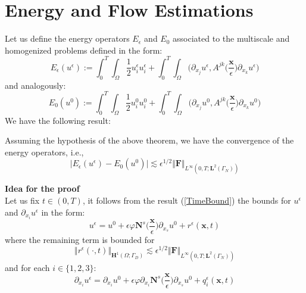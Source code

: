 \section{Energy and Flow Estimations}
Let us define the energy operators $E_{\epsilon}$ and $E_{0}$ associated to the multiscale and homogenized problems defined in the form:
\begin{equation*}
    E_{\epsilon}(u^{\epsilon}) := \int_0^T \int_{\Omega} \frac{1}{2}u_i^{\epsilon}u_i^{\epsilon} + \int_0^T \int_{\Omega} \big( \partial_{x_j} u^{\epsilon}, A^{jk} \big( \frac{\mathbf{x}}{\epsilon}\big) \partial_{x_k} u^{\epsilon} \big)
\end{equation*}
and analogously:
\begin{equation*}
    E_0(u^0) := \int_0^T \int_{\Omega} \frac{1}{2}u_i^{0}u_i^{0} + \int_0^T \int_{\Omega} \big( \partial_{x_j} u^0, A^{jk} \big( \frac{\mathbf{x}}{\epsilon}\big) \partial_{x_k} u^0 \big)
\end{equation*}
We have the following result:
\begin{lem}
Assuming the hypothesis of the above theorem, we have the convergence of the energy operators, i.e., 
\begin{equation*}
    \vert E_{\epsilon} (u^{\epsilon}) - E_0 (u^0) \vert \lesssim \epsilon^{1/2} \Vert \mathbf{F} \Vert_{L^{\infty}(0,T; \mathbf{L}^{2}(\Gamma_N))} 
\end{equation*}
\end{lem}
\textbf{Idea for the proof} \\
Let us fix $t \in (0,T)$, it follows from the result (\ref{TimeBound}) the bounds for $u^{\epsilon}$ and $\partial_{x_i} u^{\epsilon}$ in the form:
\begin{equation*}
    u^{\epsilon} = u^0 + \epsilon \varphi \mathbf{N}^s\big( \frac{\mathbf{x}}{\epsilon} \big) \partial_{x_s} u^0 + r^{\epsilon}(\mathbf{x},t) 
\end{equation*}
where the remaining term is bounded for
\begin{equation*}
    \Vert r^{\epsilon}(\cdot, t) \Vert_{\mathbf{H}^1(\Omega; \Gamma_D)} \lesssim \epsilon^{1/2} \Vert \mathbf{F}\Vert_{L^{\infty}(0,T;\mathbf{L}^{2}(\Gamma_N))}
\end{equation*}
and for each $i \in \{1,2,3\}$:
\begin{equation*}
    \partial_{x_i} u^{\epsilon} = \partial_{x_i} u^0 + \epsilon \varphi \partial_{x_i} \mathbf{N}^s \big( \frac{\mathbf{x}}{\epsilon} \big) \partial_{x_s} u^0 + q^{\epsilon}_i(\mathbf{x},t)
\end{equation*}
